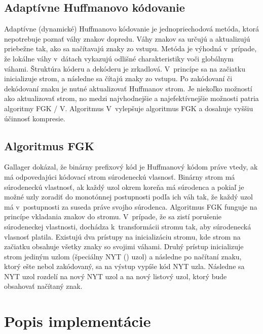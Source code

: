 \documentclass[10pt,a4paper]{article}
\begin{document}
\subsection{Adaptívne Huffmanovo kódovanie}

Adaptívne (dynamické) Huffmanovo kódovanie je jednopriechodová metóda, ktorá nepotrebuje poznať váhy znakov dopredu. Váhy znakov sa určujú a aktualizujú priebežne tak, ako sa načítavajú znaky zo vstupu. Metóda je výhodná v~prípade, že lokálne váhy v~dátach vykazujú odlišné charakteristiky voči globálnym váhami. Štruktúra kóderu a dekóderu je zrkadlová. V~princípe sa na začiatku inicializuje strom, a následne sa čítajú znaky zo vstupu. Po zakódovaní či dekódovaní znaku je nutné aktualizovať Huffmanov strom. Je niekoľko možností ako aktualizovať strom, no medzi najvhodnejšie a najefektívnejšie možnosti patria algoritmy FGK / V. Algoritmus V~vylepšuje algoritmus FGK a dosahuje vyššiu účinnosť kompresie. 

\subsection{Algoritmus FGK}

Gallager dokázal, že binárny prefixový kód je Huffmanový kódom práve vtedy, ak má odpovedajúci kódovací strom súrodeneckú vlasnosť. Binárny strom má súrodeneckú vlastnosť, ak každý uzol okrem koreňa má súrodenca a pokiaľ je možné uzly zoradiť do monotónnej postupnosti podľa ich váh tak, že každý uzol má v~postupnosti za suseda práve svojho súrodenca. Algoritmus FGK funguje na princípe vkladania znakov do stromu. V~prípade, že sa zistí porušenie súrodeneckej vlastnosti, dochádza k~transformácii stromu tak, aby súrodenecká vlasnosť platila. Existujú dva prístupy na inicializáciu stromu, kde strom na začiatku obsahuje všetky znaky so svojimi váhami. Druhý prístup inicializuje strom jediným uzlom (špeciálny NYT () uzol) a následne po načítaní znaku, ktorý ešte nebol zakódovaný, sa na výstup vypíše kód NYT uzla. Následne sa NYT uzol rozdelí na nový NYT uzol a na nový listový uzol, ktorý bude obsahovať načítaný znak.

\section{Popis implementácie}
\end{document}
